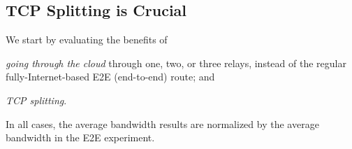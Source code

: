 \documentclass[sigconf,usenames,dvipsnames,geometry]{acmart}
\newcommand{\mycomm}[3]{{\color{#2} \textbf{[#1: #3]}}}
\newcommand{\mycomm}[3]{}
\newcommand{\IK}[1]{\mycomm{IK}{blue}{#1}}
\newcommand{\AB}[1]{\mycomm{AB}{Orange}{#1}}
\newcommand{\NR}[1]{\mycomm{NR}{OliveGreen}{#1}}
\begin{document}






\subsection{TCP Splitting is Crucial} 

We start by evaluating the benefits of 
\begin{inlinelist}
    \item \textit{going through the cloud} through one, two, or three relays,  instead of the regular fully-Internet-based E2E (end-to-end) route; and \item \textit{TCP splitting}.
\end{inlinelist} In all cases, the average bandwidth results are normalized by the average bandwidth in the E2E experiment.
\end{document}
